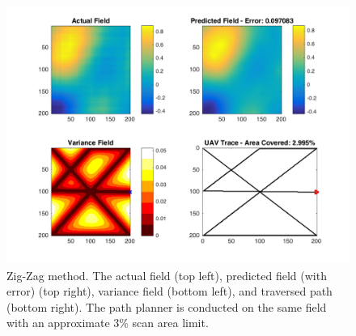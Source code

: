 \begin{figure}[htb!]
    \centering
    \includegraphics[width=0.8\linewidth]{figures/nhv_200x200_10_percent.png}
	\captionsetup{skip=0.25\baselineskip,size=footnotesize}
	\caption{Zig-Zag method. The actual field (top left), predicted field (with error) (top right), variance field (bottom left), and traversed path (bottom right). The path planner is conducted on the same field with an approximate 3\% scan area limit.}
\end{figure}
